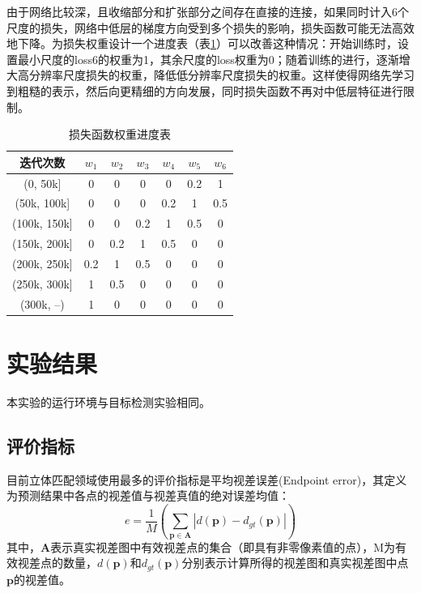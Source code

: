 由于网络比较深，且收缩部分和扩张部分之间存在直接的连接，如果同时计入6个尺度的损失，网络中低层的梯度方向受到多个损失的影响，损失函数可能无法高效地下降。为损失权重设计一个进度表（表\ref{tab:4_2_loss_weight_schedule}）可以改善这种情况：开始训练时，设置最小尺度的loss6的权重为1，其余尺度的loss权重为0；随着训练的进行，逐渐增大高分辨率尺度损失的权重，降低低分辨率尺度损失的权重。这样使得网络先学习到粗糙的表示，然后向更精细的方向发展，同时损失函数不再对中低层特征进行限制。

\begin{table}[htb]
	\centering
	\caption{损失函数权重进度表}
	\label{tab:4_2_loss_weight_schedule}
	\begin{small} %
		\begin{tabular*}{\textwidth}{@{\extracolsep{\fill}}ccccccc} \toprule[2pt]
			迭代次数  & $w_1$ & $w_2$ & $w_3$ & $w_4$ & $w_5$ & $w_6$ \\ \midrule[1pt]
			(0, 50k]           & 0 & 0 & 0 & 0 & 0.2 & 1 \\
			(50k, 100k]     & 0 & 0 & 0 & 0.2 & 1 & 0.5 \\
			(100k, 150k]    & 0 & 0 & 0.2 & 1 & 0.5 & 0 \\
			(150k, 200k]    & 0 & 0.2 & 1 & 0.5 & 0 & 0 \\
			(200k, 250k]    & 0.2 & 1 & 0.5 & 0 & 0 & 0  \\
			(250k, 300k]    & 1 & 0.5 & 0 & 0 & 0 & 0  \\
			(300k, --)          & 1 & 0 & 0 & 0 & 0 & 0 \\ \bottomrule[2pt]
		\end{tabular*}
	\end{small} %
\end{table}

\section{实验结果}
本实验的运行环境与目标检测实验相同。

\subsection{评价指标}
目前立体匹配领域使用最多的评价指标是平均视差误差(Endpoint error)，其定义为预测结果中各点的视差值与视差真值的绝对误差均值：
\begin{equation}\label{eq:4_3_endpoint_error}
e = \frac{1}{M} \left( \sum_{\mathbf{p} \in \mathbf{A}} | d(\mathbf{p}) - d_{gt}(\mathbf{p}) | \right)
\end{equation}
其中，$\mathbf{A}$表示真实视差图中有效视差点的集合（即具有非零像素值的点），M为有效视差点的数量，$d(\mathbf{p})$和$d_{gt}(\mathbf{p})$分别表示计算所得的视差图和真实视差图中点$\mathbf{p}$的视差值。

